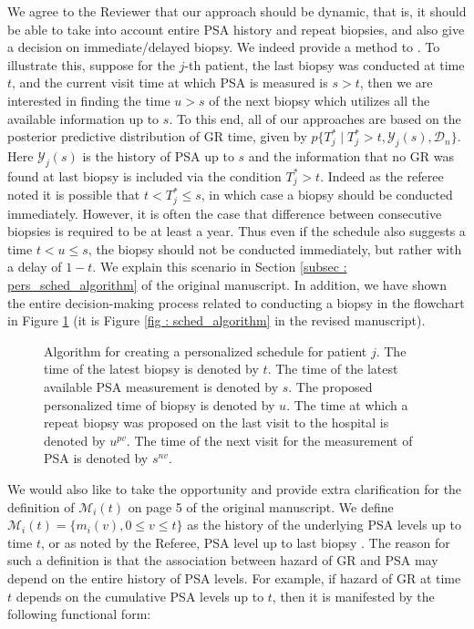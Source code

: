 \begin{enumerate}
    We agree to the Reviewer that our approach should be dynamic, that is, it should be able to take into account entire PSA history and repeat biopsies, and also give a decision on immediate/delayed biopsy. We indeed provide a method to . To illustrate this, suppose for the $j$-th patient, the last biopsy was conducted at time $t$, and the current visit time at which PSA is measured is $s > t$, then we are interested in finding the time $u > s$ of the next biopsy which utilizes all the available information up to $s$. To this end, all of our approaches are based on the posterior predictive distribution of GR time, given by $p\big\{T^*_j \mid T^*_j > t, \mathcal{Y}_j(s), \mathcal{D}_n\big\}$. Here $\mathcal{Y}_j(s)$ is the history of PSA up to $s$ and the information that no GR was found at last biopsy is included via the condition $T^*_j > t$. Indeed as the referee noted it is possible that $t <T^*_j \leq s$, in which case a biopsy should be conducted immediately. However, it is often the case that difference between consecutive biopsies is required to be at least a year. Thus even if the schedule also suggests a time $t < u \leq s$, the biopsy should not be conducted immediately, but rather with a delay of $1 - t$. We explain this scenario in Section \ref{subsec : pers_sched_algorithm} of the original manuscript. In addition, we have shown the entire decision-making process related to conducting a biopsy in the flowchart in Figure \ref{fig : sched_algorithm_ref2} (it is Figure \ref{fig : sched_algorithm} in the revised manuscript).

    \begin{figure}
\centerline{}
\caption{Algorithm for creating a personalized schedule for patient $j$. The time of the latest biopsy is denoted by $t$. The time of the latest available PSA measurement is denoted by $s$. The proposed personalized time of biopsy is denoted by $u$.  The time at which a repeat biopsy was proposed on the last visit to the hospital is denoted by $u^{pv}$. The time of the next visit for the measurement of PSA is denoted by $s^{nv}$.} 
\label{fig : sched_algorithm_ref2}
\end{figure}

    We would also like to take the opportunity and provide extra clarification for the definition of $\mathcal{M}_i(t)$ on page 5 of the original manuscript. We define $\mathcal{M}_i(t) = \{m_i(v), 0\leq v \leq t\}$ as the history of the underlying PSA levels up to time $t$, or as noted by the Referee, PSA level up to last biopsy \citep{tsiatis2004joint,rizopoulos2012joint}. The reason for such a definition is that the association between hazard of GR and PSA may depend on the entire history of PSA levels. For example, if hazard of GR at time $t$ depends on the cumulative PSA levels up to $t$, then it is manifested by the following functional form:
    

\end{enumerate}
